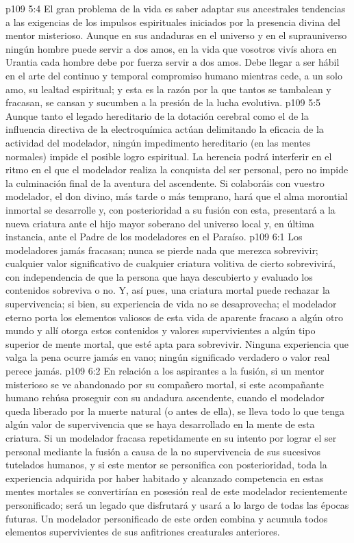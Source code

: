 \vs p109 5:4 \pc El gran problema de la vida es saber adaptar sus ancestrales tendencias a las exigencias de los impulsos espirituales iniciados por la presencia divina del mentor misterioso. Aunque en sus andaduras en el universo y en el suprauniverso ningún hombre puede servir a dos amos, en la vida que vosotros vivís ahora en Urantia cada hombre debe por fuerza servir a dos amos. Debe llegar a ser hábil en el arte del continuo y temporal compromiso humano mientras cede, a un solo amo, su lealtad espiritual; y esta es la razón por la que tantos se tambalean y fracasan, se cansan y sucumben a la presión de la lucha evolutiva.
\vs p109 5:5 Aunque tanto el legado hereditario de la dotación cerebral como el de la influencia directiva de la electroquímica actúan delimitando la eficacia de la actividad del modelador, ningún impedimento hereditario (en las mentes normales) impide el posible logro espiritual. La herencia podrá interferir en el ritmo en el que el modelador realiza la conquista del ser personal, pero no impide la culminación final de la aventura del ascendente. Si colaboráis con vuestro modelador, el don divino, más tarde o más temprano, hará que el alma morontial inmortal se desarrolle y, con posterioridad a su fusión con esta, presentará a la nueva criatura ante el hijo mayor soberano del universo local y, en última instancia, ante el Padre de los modeladores en el Paraíso.
\vs p109 6:1 Los modeladores jamás fracasan; nunca se pierde nada que merezca sobrevivir; cualquier valor significativo de cualquier criatura volitiva de cierto sobrevivirá, con independencia de que la persona que haya descubierto y evaluado los contenidos sobreviva o no. Y, así pues, una criatura mortal puede rechazar la supervivencia; si bien, su experiencia de vida no se desaprovecha; el modelador eterno porta los elementos valiosos de esta vida de aparente fracaso a algún otro mundo y allí otorga estos contenidos y valores supervivientes a algún tipo superior de mente mortal, que esté apta para sobrevivir. Ninguna experiencia que valga la pena ocurre jamás en vano; ningún significado verdadero o valor real perece jamás.
\vs p109 6:2 En relación a los aspirantes a la fusión, si un mentor misterioso se ve abandonado por su compañero mortal, si este acompañante humano rehúsa proseguir con su andadura ascendente, cuando el modelador queda liberado por la muerte natural (o antes de ella), se lleva todo lo que tenga algún valor de supervivencia que se haya desarrollado en la mente de esta criatura. Si un modelador fracasa repetidamente en su intento por lograr el ser personal mediante la fusión a causa de la no supervivencia de sus sucesivos tutelados humanos, y si este mentor se personifica con posterioridad, toda la experiencia adquirida por haber habitado y alcanzado competencia en estas mentes mortales se convertirían en posesión real de este modelador recientemente personificado; será un legado que disfrutará y usará a lo largo de todas las épocas futuras. Un modelador personificado de este orden combina y acumula todos elementos supervivientes de sus anfitriones creaturales anteriores.
